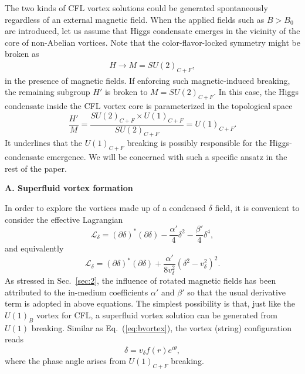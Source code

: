 \documentclass[12pt]{article}
\begin{document}
The two kinds of CFL vortex solutions could be generated spontaneously regardless of an
external magnetic field.
When the applied fields such as $B > B_0$ are introduced, let us assume that Higgs condensate
emerges in the vicinity of the core of non-Abelian vortices. Note that the color-flavor-locked
symmetry might be broken as \cite{ferrer2007magnetic}
\begin{eqnarray}
H\rightarrow M=SU(2)_{C+F},
\label{cfl2}\end{eqnarray}
in the presence of magnetic fields.
If enforcing such magnetic-induced breaking, the remaining subgroup $H'$ is broken to $M =SU(2)_{C+F}$.
In this case, the Higgs condensate inside the CFL vortex core is parameterized in the topological space
\begin{equation}
  \label{eq:mcfsymm}
 \frac{H'}{M} = \frac{SU(2)_{C+F} \times U(1)_{C+F}}{SU(2)_{C+F}} = U(1)_{C+F}.
\end{equation}
It underlines that the $U(1)_{C+F}$ breaking is possibly responsible for
the Higgs-condensate emergence. We will be concerned with such a specific ansatz in the rest of the paper.

\vspace{0.2cm}
\textbf{A. Superfluid vortex formation }
\vspace{0.2cm}

In order to explore the vortices made up of a condensed $\delta$ field, it is convenient to consider the effective Lagrangian
\begin{equation}
\label{eq:mcflvorticehamilton}
 \mathcal{L}_\delta = (\partial \delta)^* (\partial \delta) - \frac{\alpha'}{4}\delta^2 - \frac{\beta'}{4}\delta^4,
\end{equation}
and equivalently
\begin{equation}
  \label{eq:vortond}
  \mathcal{L}_\delta = (\partial \delta)^* (\partial \delta) + \frac{\alpha'}{8 v_\delta^2}(\delta^2 - v_\delta^2)^2.
\end{equation}
As stressed in Sec.~\ref{sec:2}, the influence of rotated magnetic fields has been attributed to the in-medium
coefficients ${\alpha'}$ and ${\beta'}$ so that the usual derivative term is adopted in above equations.
The simplest possibility is that, just like the $U(1)_B$ vortex for CFL, a superfluid vortex solution can be
generated from $U(1)$ breaking. Similar as Eq.~(\ref{eq:bvortex}), the vortex (string) configuration reads
\begin{equation}
	\delta= v_\delta f(r) e^{i\theta},\label{mcflvortex}
\end{equation}
where the phase angle arises from $U(1)_{C+F}$ breaking.
\end{document}
